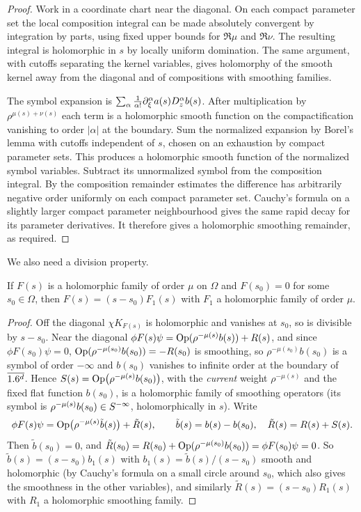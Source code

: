 \begin{proof}
Work in a coordinate chart near the diagonal. On each compact parameter set the
local composition integral can be made absolutely convergent by integration by
parts, using fixed upper bounds for $\Re\mu$ and $\Re\nu$. The resulting
integral is holomorphic in $s$ by locally uniform domination. The same
argument, with cutoffs separating the kernel variables, gives holomorphy of
the smooth kernel away from the diagonal and of compositions with smoothing
families.

The symbol expansion is $\sum_\alpha\frac1{\alpha!}\partial_\xi^\alpha a(s)
D_z^\alpha b(s)$. After multiplication by $\rho^{\mu(s)+\nu(s)}$ each term is a
holomorphic smooth function on the compactification vanishing to order
$|\alpha|$ at the boundary. Sum the normalized expansion by Borel's lemma with
cutoffs independent of $s$, chosen on an exhaustion by compact parameter
sets. This produces a holomorphic smooth function of the normalized
symbol variables. Subtract its unnormalized symbol from the composition
integral. By the composition remainder estimates the difference has
arbitrarily negative order uniformly on each compact parameter set. Cauchy's
formula on a slightly larger compact parameter neighbourhood gives the same
rapid decay for its parameter derivatives. It therefore gives a holomorphic
smoothing remainder, as required.
\end{proof}

We also need a division property.

\begin{lemma}\label{eta:lem:division}
If $F(s)$ is a holomorphic family of order $\mu$ on $\Omega$ and $F(s_0)=0$ for some
$s_0\in\Omega$, then $F(s)=(s-s_0)F_1(s)$ with $F_1$ a holomorphic family of order
$\mu$.
\end{lemma}

\begin{proof} Off the diagonal $\chi K_{F(s)}$ is holomorphic and vanishes at $s_0$,
so is divisible by $s-s_0$. Near the diagonal $\phi F(s)\psi=\operatorname{Op}(\rho^{-\mu(s)}b(s))
+R(s)$, and since $\phi F(s_0)\psi=0$, $\operatorname{Op}(\rho^{-\mu(s_0)}b(s_0))=-R(s_0)$ is
smoothing, so $\rho^{-\mu(s_0)}b(s_0)$ is a symbol of order $-\infty$ and $b(s_0)$
vanishes to infinite order at the boundary of $\overline{1.6^d}$. Hence
$S(s)=\operatorname{Op}\bigl(\rho^{-\mu(s)}b(s_0)\bigr)$, with the \emph{current} weight
$\rho^{-\mu(s)}$ and the fixed flat function $b(s_0)$, is a holomorphic family of
smoothing operators (its symbol is $\rho^{-\mu(s)}b(s_0)\in S^{-\infty}$, holomorphically
in $s$). Write
\[
\phi F(s)\psi=\operatorname{Op}\bigl(\rho^{-\mu(s)}\tilde b(s)\bigr)+\tilde R(s),\qquad
\tilde b(s)=b(s)-b(s_0),\quad\tilde R(s)=R(s)+S(s).
\]
Then $\tilde b(s_0)=0$, and $\tilde R(s_0)=R(s_0)+\operatorname{Op}(\rho^{-\mu(s_0)}b(s_0))=
\phi F(s_0)\psi=0$. So $\tilde b(s)=(s-s_0)b_1(s)$ with
$b_1(s)=\tilde b(s)/(s-s_0)$ smooth and holomorphic (by Cauchy's formula on a small
circle around $s_0$, which also gives the smoothness in the other variables), and
similarly $\tilde R(s)=(s-s_0)R_1(s)$ with $R_1$ a holomorphic smoothing family.
\end{proof}

